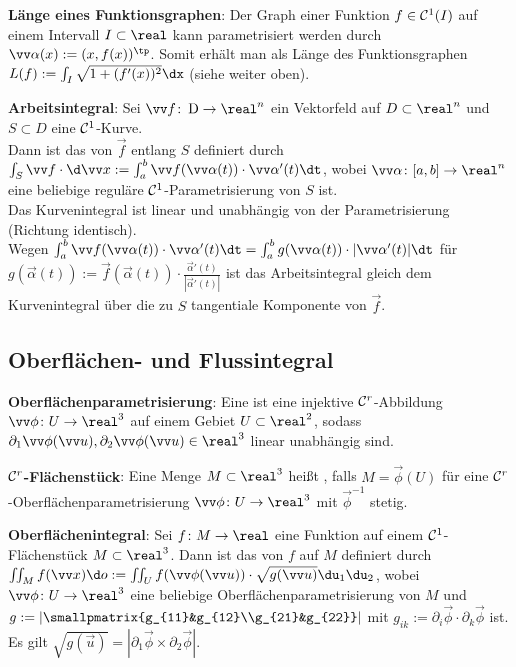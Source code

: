 \textbf{Länge eines Funktionsgraphen}:
Der Graph einer Funktion $f \in \mathcal{C}^1(I)$ auf einem Intervall $I \subset \real$
kann parametrisiert werden durch $\vec{\alpha}(x) := (x, f(x))^\tp$.
Somit erhält man als Länge des Funktionsgraphen $L(f) := \int_I \sqrt{1 + (f'(x))^2} \dx$
(siehe weiter oben).

\linie

\textbf{Arbeitsintegral}:
Sei $\vec{f}\colon \D \to \real^n$ ein Vektorfeld auf $D \subset \real^n$
und $S \subset D$ eine $\mathcal{C}^1$-Kurve.\\
Dann ist das  von $\vec{f}$ entlang $S$ definiert durch
$\int_S \vec{f} \cdot \d\vec{x} := \int_a^b \vec{f}(\vec{\alpha}(t)) \cdot \vec{\alpha}'(t) \dt$,
wobei $\vec{\alpha}\colon [a, b] \to \real^n$ eine beliebige reguläre $\mathcal{C}^1$-Parametrisierung von
$S$ ist.\\
Das Kurvenintegral ist linear und unabhängig von der Parametrisierung
(Richtung identisch).\\
Wegen $\int_a^b \vec{f}(\vec{\alpha}(t)) \cdot \vec{\alpha}'(t) \dt
= \int_a^b g(\vec{\alpha}(t)) \cdot |\vec{\alpha}'(t)| \dt$
für $g(\vec{\alpha}(t))
:= \vec{f}(\vec{\alpha}(t)) \cdot \frac{\vec{\alpha}'(t)}{|\vec{\alpha}'(t)|}$
ist das Arbeitsintegral gleich dem Kurvenintegral über die zu $S$ tangentiale Komponente von
$\vec{f}$.

\pagebreak

\subsection{%
    Oberflächen- und Flussintegral%
}

\textbf{Oberflächenparametrisierung}:
Eine  ist eine injektive $\mathcal{C}^r$-Abbildung
$\vec{\phi}\colon U \to \real^3$ auf einem Gebiet $U \subset \real^2$,
sodass $\partial_1 \vec{\phi}(\vec{u}), \partial_2 \vec{\phi}(\vec{u}) \in \real^3$
linear unabhängig sind.

\textbf{$\mathcal{C}^r$-Flächenstück}:
Eine Menge $M \subset \real^3$ heißt , falls
$M = \vec{\phi}(U)$ für eine $\mathcal{C}^r$-Oberflächenparametrisierung $\vec{\phi}\colon U \to \real^3$
mit $\vec{\phi}^{-1}$ stetig.

\linie

\textbf{Oberflächenintegral}:
Sei $f\colon M \to \real$ eine Funktion auf einem $\mathcal{C}^1$-Flächenstück $M \subset \real^3$.
Dann ist das  von $f$ auf $M$ definiert durch\\
$\iint_M f(\vec{x}) \d o := \iint_U f(\vec{\phi}(\vec{u})) \cdot \sqrt{g(\vec{u})} \du_1 \du_2$,
wobei $\vec{\phi}\colon U \to \real^3$ eine beliebige Oberflächenparametrisierung von $M$ und
$g := \left|\smallpmatrix{g_{11}&g_{12}\\g_{21}&g_{22}}\right|$ mit
$g_{ik} := \partial_i \vec{\phi} \cdot \partial_k \vec{\phi}$ ist.
Es gilt $\sqrt{g(\vec{u})} = |\partial_1 \vec{\phi} \times \partial_2 \vec{\phi}|$.

